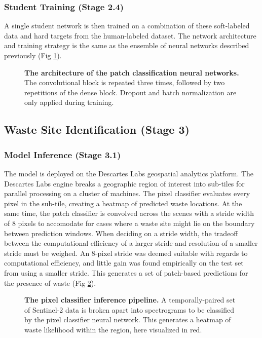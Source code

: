 \documentclass[10pt,letterpaper]{article}
\begin{document}
\subsubsection*{Student Training (Stage 2.4)}
A single student network is then trained on a combination of these soft-labeled data and  hard targets from the human-labeled dataset. The network architecture and training strategy is the same as the ensemble of neural networks described previously (Fig \ref{fig:patch_architecture}).

\begin{figure}[!h]
    \caption{{\bf The architecture of the patch classification neural networks.}
    The convolutional block is repeated three times, followed by two repetitions of the dense block. Dropout and batch normalization are only applied during training.}
    \label{fig:patch_architecture}
\end{figure}

\subsection*{Waste Site Identification (Stage 3)}
\subsubsection*{Model Inference (Stage 3.1)}
The model is deployed on the Descartes Labs geospatial analytics platform. The Descartes Labs engine breaks a geographic region of interest into sub-tiles for parallel processing on a cluster of machines. The pixel classifier evaluates every pixel in the sub-tile, creating a heatmap of predicted waste locations. At the same time, the patch classifier is convolved across the scenes with a stride width of 8 pixels to accomodate for cases where a waste site might lie on the boundary between prediction windows. When deciding on a stride width, the tradeoff between the computational efficiency of a larger stride and resolution of a smaller stride must be weighed. An 8-pixel stride was deemed suitable with regards to computational efficiency, and little gain was found empirically on the test set from using a smaller stride. This generates a set of patch-based predictions for the presence of waste (Fig \ref{fig:pixel_inference}).

\begin{figure}[!h]
    \caption{{\bf The pixel classifier inference pipeline.}
    A temporally-paired set of Sentinel-2 data is broken apart into spectrograms to be classified by the pixel classifier neural network. This generates a heatmap of waste likelihood within the region, here visualized in red.}
    \label{fig:pixel_inference}
\end{figure}
\end{document}
